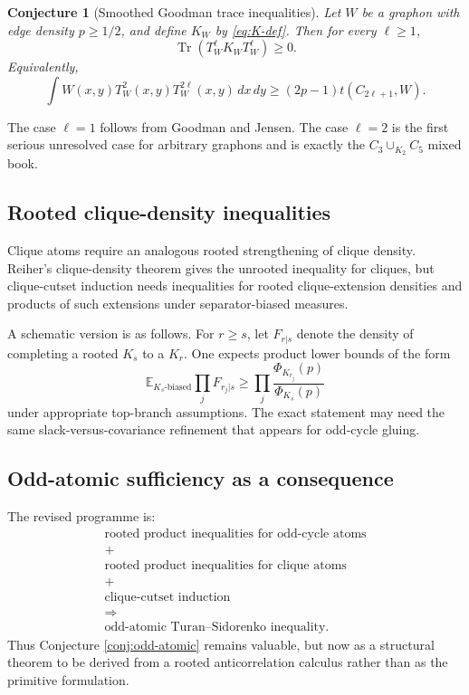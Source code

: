 \documentclass[11pt]{article}
\newtheorem{conjecture}[theorem]{Conjecture}
\theoremstyle{definition}
\newcommand{\E}{\mathbb E}
\newcommand{\Tr}{\operatorname{Tr}}
\begin{document}
\begin{conjecture}[Smoothed Goodman trace inequalities]\label{conj:SG}
Let $W$ be a graphon with edge density $p\ge1/2$, and define $K_W$ by \eqref{eq:K-def}.  Then for every $\ell\ge1$,
\begin{equation}\label{eq:SG-ell}
  \Tr(T_W^\ell K_WT_W^\ell)\ge0.
\end{equation}
Equivalently,
\begin{equation}\label{eq:local-goodman-ell}
  \int W(x,y)T_W^2(x,y)T_W^{2\ell}(x,y)\,dx\,dy
  \ge
  (2p-1)t(C_{2\ell+1},W).
\end{equation}
\end{conjecture}

The case $\ell=1$ follows from Goodman and Jensen.  The case $\ell=2$ is the first serious unresolved case for arbitrary graphons and is exactly the $C_3\cup_{K_2}C_5$ mixed book.

\subsection{Rooted clique-density inequalities}

Clique atoms require an analogous rooted strengthening of clique density.  Reiher's clique-density theorem gives the unrooted inequality for cliques, but clique-cutset induction needs inequalities for rooted clique-extension densities and products of such extensions under separator-biased measures.

A schematic version is as follows.  For $r\ge s$, let $F_{r|s}$ denote the density of completing a rooted $K_s$ to a $K_r$.  One expects product lower bounds of the form
\[
  \E_{K_s\text{-biased}}\prod_j F_{r_j|s}
  \ge
  \prod_j \frac{\Phi_{K_{r_j}}(p)}{\Phi_{K_s}(p)}
\]
under appropriate top-branch assumptions.  The exact statement may need the same slack-versus-covariance refinement that appears for odd-cycle gluing.

\subsection{Odd-atomic sufficiency as a consequence}

The revised programme is:
\[
\boxed{
\begin{array}{c}
\text{rooted product inequalities for odd-cycle atoms}\\[2mm]
+\\[-1mm]
\text{rooted product inequalities for clique atoms}\\[2mm]
+\\[-1mm]
\text{clique-cutset induction}\\[2mm]
\Longrightarrow\\[2mm]
\text{odd-atomic Turan--Sidorenko inequality.}
\end{array}}
\]
Thus Conjecture \ref{conj:odd-atomic} remains valuable, but now as a structural theorem to be derived from a rooted anticorrelation calculus rather than as the primitive formulation.
\end{document}

